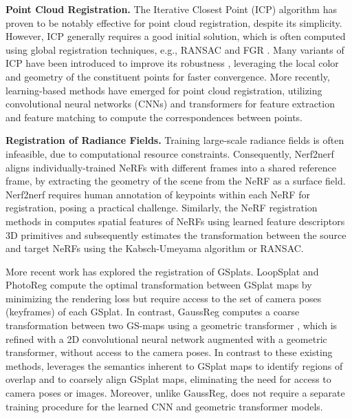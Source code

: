 \smallskip
\noindent\textbf{Point Cloud Registration.}
The Iterative Closest Point (ICP) algorithm \cite{besl1992method} has proven to be notably effective for point cloud registration, despite its simplicity. However, ICP generally requires a good initial solution, which is often computed using global registration techniques, e.g., RANSAC \cite{fischler1981random, holz2015registration} and FGR \cite{zhou2016fast}. Many variants of ICP have been introduced to improve its robustness \cite{chen1992object, rusinkiewicz2001efficient, bouaziz2013sparse, park2017colored}, leveraging the local color and geometry of the constituent points for faster convergence. More recently, learning-based methods \cite{wang2019deep, fu2021robust, qin2023geotransformer} have emerged for point cloud registration, utilizing convolutional neural networks (CNNs) and transformers for feature extraction and feature matching to compute the correspondences between points.

\smallskip
\noindent\textbf{Registration of Radiance Fields.}
Training large-scale radiance fields is often infeasible, due to computational resource constraints. 
Consequently, Nerf2nerf \cite{goli2023nerf2nerf} aligns individually-trained NeRFs with different frames into a shared reference frame, by extracting the geometry of the scene from the NeRF as a surface field. Nerf2nerf requires human annotation of keypoints within each NeRF for registration, posing a practical challenge.
Similarly, the NeRF registration methods in \cite{jiang2023registering, chen2023dreg} computes spatial features of NeRFs using learned feature descriptors $3$D primitives and subsequently estimates the transformation between the source and target NeRFs using the Kabsch-Umeyama algorithm \cite{umeyama1991least} or RANSAC.

More recent work has explored the registration of GSplats. 
LoopSplat \cite{zhu2024loopsplat} and PhotoReg \cite{yuan2024photoreg} compute the optimal transformation between GSplat maps by minimizing the rendering loss but require access to the set of camera poses (keyframes) of each GSplat. In contrast, GaussReg \cite{chang2025gaussreg} computes a coarse transformation between two GS-maps using a geometric transformer \cite{qin2023geotransformer}, which is refined with a 2D convolutional neural network augmented with a geometric transformer, without access to the camera poses. In contrast to these existing methods, \algname leverages the semantics inherent to GSplat maps to identify regions of overlap and to coarsely align GSplat maps, eliminating the need for access to camera poses or images. Moreover, unlike GaussReg, \algname does not require a separate training procedure for the learned CNN and geometric transformer models.

